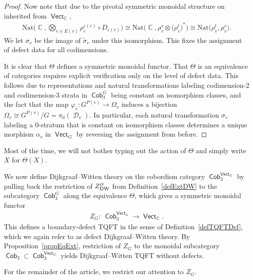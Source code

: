 \documentclass[pdftex]{sigma}
\DeclareMathOperator{\vect}{\mathsf{Vect}}
\DeclareMathOperator{\Fun}{\mathsf{Fun}}
\DeclareMathOperator{\C}{\mathbb{C}}
\DeclareMathOperator{\Cob}{\mathsf{Cob}}
\DeclareMathOperator{\cald}{\mathcal{D}}
\numberwithin{equation}{section}
\theoremstyle{definition}
\begin{document}
\begin{proof}
 Now note that due to the pivotal symmetric monoidal structure on \smash{$\vect_{\C}^{\cald_v} = \Fun(\mathcal{D}_v, \vect_{\C})$} inherited from $\vect_{\C}$,
 \begin{align*}
 \mathrm{Nat}\biggl(\C, \bigotimes_{e \in E(v)} \rho_e^{\varepsilon(e)}\circ D_{\varepsilon(e)}\biggr) \cong \mathrm{Nat}\bigl(\C, \rho_v^s \otimes \bigl(\rho_v^t\bigr)^*\bigr) \cong \mathrm{Nat}\bigl( \rho_v^t, \rho_v^s \bigr).
 \end{align*}
 We let $\sigma_v$ be the image of $\widetilde{\sigma}_v$ under this isomorphism. This fixes the assignment of defect data for all codimensions.

 It is clear that $\Theta$ defines a symmetric monoidal functor. That $\Theta$ is an equivalence of categories requires explicit verification only on the level of defect data. This follows due to representations and natural transformations labeling codimension-2 and codimension-3 strata in $\Cob_3^G$ being constant on isomorphism classes, and the fact that the map $\varphi_v\colon G^{P(v)} \rightarrow \Omega_v$ induces a bijection $\Omega_v \cong G^{P(v)}/G = \pi_0(\cald_v)$. In particular, each natural transformation $\sigma_v$ labeling a 0-stratum that is constant on isomorphism classes determines a unique morphism $\alpha_v$ in $\vect_G$ by reversing the assignment from before.
\end{proof}

Most of the time, we will not bother typing out the action of $\Theta$ and simply write $X$ for $\Theta(X)$.

We now define Dijkgraaf--Witten theory on the cobordism category $\Cob_3^{\vect_G}$ by pulling back the restriction of $Z_{\rm DW}^{\partial}$ from Definition~\ref{defExtDW} to the subcategory $ \Cob_3^G$ along the equivalence $\Theta$, which gives a symmetric monoidal functor
\begin{align*}
 Z_G\colon \ \Cob_3^{\vect_G} \rightarrow \vect_{\C}.
\end{align*}
This defines a boundary-defect TQFT in the sense of Definition~\ref{defTQFTDef}, which we again refer to as defect Dijkgraaf--Witten theory. By Proposition~\ref{propEqExt}, restriction of $Z_G$ to the monoidal subcategory $\Cob_3 \subset \Cob_3^{\vect_G}$ yields Dijkgraaf--Witten TQFT without defects.

For the remainder of the article, we restrict our attention to $Z_G$.
\end{document}
